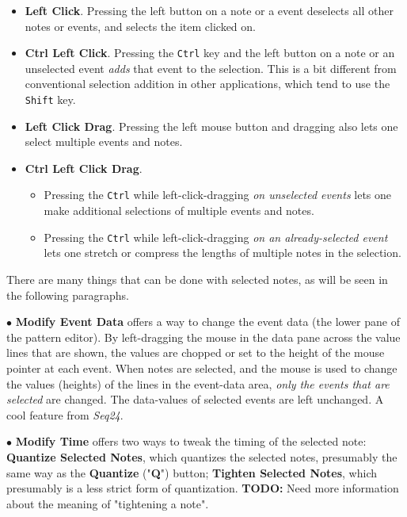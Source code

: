    \begin{itemize}
      \item {}
         \textbf{Left Click}.
         Pressing the left button on a note or a event deselects all other
         notes or events, and selects the item clicked on.
      \item {}
         \textbf{Ctrl Left Click}.
         Pressing the \texttt{Ctrl} key and the left button on a note or an
         unselected event \textsl{adds} that event to the selection.
         This is a bit different from conventional selection addition
         in other applications, which tend to use the \texttt{Shift} key.
      \item {}
         \textbf{Left Click Drag}.
         Pressing the left mouse button and dragging also lets one
         select multiple events and notes.
      \item {}
         \textbf{Ctrl Left Click Drag}.
         \begin{itemize}
            \item Pressing the \texttt{Ctrl} while left-click-dragging
               \textsl{on unselected events} lets one make additional
               selections of multiple events and notes.
            \item Pressing the \texttt{Ctrl} while left-click-dragging
               \textsl{on an already-selected event} lets one stretch or
               compress the lengths of multiple notes in the selection.
         \end{itemize}
   \end{itemize}

   There are many things that can be done with selected notes, as will be seen
   in the following paragraphs.

   $\bullet$ \textbf{Modify Event Data} offers a way to change the event data
   (the lower pane of the pattern editor).
   By left-dragging the mouse in the data pane across the value lines that are
   shown, the values are chopped or set to the height of the mouse pointer at
   each event.
   When notes are selected, and the
   mouse is used to change the values (heights) of the lines in the event-data
   area,
   \textsl{only the events that are selected} are changed.  The data-values of
   selected events are left unchanged.  A cool feature from \textsl{Seq24}.

   $\bullet$ \textbf{Modify Time} offers two ways to tweak the timing of the
   selected note:
   \textbf{Quantize Selected Notes}, which quantizes the selected
   notes, presumably the same way as the \textbf{Quantize} ("\textbf{Q}")
   button;
   \textbf{Tighten Selected Notes}, which presumably is a less
   strict form of quantization.
   \textbf{TODO:}
   Need more information about the meaning of "tightening a note".

